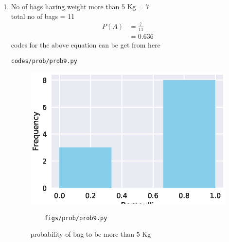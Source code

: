 \renewcommand{\theequation}{\theenumi}
\begin{enumerate}[label=\arabic*.,ref=\thesubsection.\theenumi]
\item No of bags having weight more than 5 Kg = 7
\\
total no of bags = 11
\begin{align}
P\left(A\right) &= \frac{7}{11}
\\
&=0.636
\end{align}
codes for the above equation can be get from here
\begin{lstlisting}
codes/prob/prob9.py
\end{lstlisting}
\begin{figure}[!ht]
	\centering
	\includegraphics[width=\columnwidth]{./figures/prob/prob8.eps}
	\caption{probability of bag to be more than 5 Kg  }
	\label{fig:bt9}
	\begin{lstlisting}
	figs/prob/prob9.py
	\end{lstlisting}
\end{figure}
\end{enumerate}